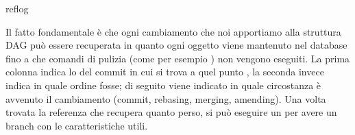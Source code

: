  reflog

Il fatto fondamentale \`e che ogni cambiamento che noi apportiamo alla struttura
DAG pu\`o essere recuperata in quanto ogni oggetto viene mantenuto nel database
fino a che comandi di pulizia (come per esempio ) non vengono eseguiti.
La prima colonna indica lo  del commit in cui si trova a quel punto
, la seconda invece indica in quale ordine fosse; di seguito viene
indicato in quale circostanza \`e avvenuto il cambiamento (commit, rebasing,
merging, amending). Una volta trovata la referenza che recupera quanto perso, si
pu\`o eseguire un  per avere un branch con
le caratteristiche utili.

